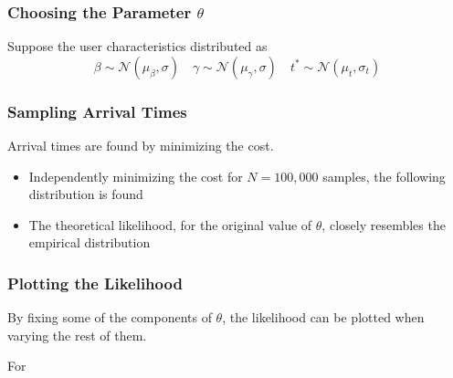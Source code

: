 \documentclass[hyperref={pdfpagelabels=false}]{beamer}
\begin{document}
\begin{frame}
  \frametitle{Choosing the Parameter $\theta$}
  Suppose the user characteristics distributed as
  \begin{equation*}
    \beta \sim \mathcal{N}(\mu_\beta, \sigma) \quad \gamma \sim \mathcal{N}(\mu_\gamma, \sigma) \quad t^* \sim \mathcal{N}(\mu_t, \sigma_t)
  \end{equation*}
\end{frame}

\begin{frame}
  \frametitle{Sampling Arrival Times}
  Arrival times are found by minimizing the cost.
  \begin{itemize}
  \item Independently minimizing the cost for \(N = 100,000\) samples, the following distribution is found
  \item<2-> The theoretical likelihood, for the original value of \(\theta\), closely resembles the empirical distribution
  \end{itemize}
  \centering
\end{frame}

\begin{frame}
  \frametitle{Plotting the Likelihood}
  By fixing some of the components of \(\theta\), the likelihood can be plotted when varying the rest of them.

  For 

  \centering
\end{frame}
\end{document}
